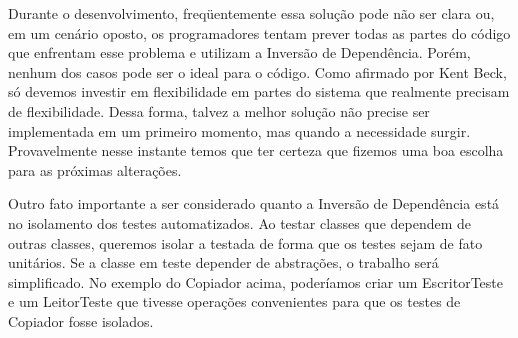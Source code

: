 Durante o desenvolvimento, freqüentemente essa solução pode não ser clara ou, em um cenário oposto, os programadores tentam prever todas as partes do código que enfrentam esse problema e utilizam a Inversão de Dependência. Porém, nenhum dos casos pode ser o ideal para o código. Como afirmado por Kent Beck, só devemos investir em flexibilidade em partes do sistema que realmente precisam de flexibilidade. Dessa forma, talvez a melhor solução não precise ser implementada em um primeiro momento, mas quando a necessidade surgir. Provavelmente nesse instante temos que ter certeza que fizemos uma boa escolha para as próximas alterações.
	
Outro fato importante a ser considerado quanto a Inversão de Dependência está no isolamento dos testes automatizados. Ao testar classes que dependem de outras classes, queremos isolar a testada de forma que os testes sejam de fato unitários. Se a classe em teste depender de abstrações, o trabalho será simplificado. No exemplo do Copiador acima, poderíamos criar um EscritorTeste e um LeitorTeste que tivesse operações convenientes para que os testes de Copiador fosse isolados.


